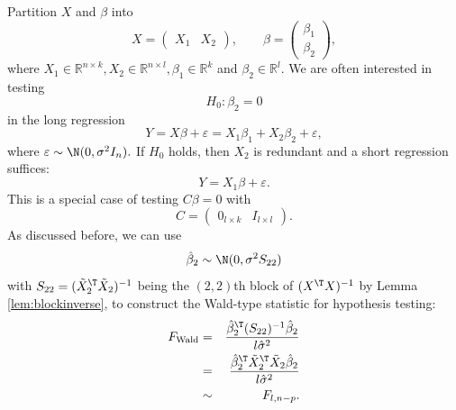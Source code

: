 Partition $X$ and $\beta$ into
\[
X=\left(\begin{array}{cc}
X_{1} & X_{2}\end{array}\right),\qquad\beta=\left(\begin{array}{c}
\beta_{1}\\
\beta_{2}
\end{array}\right),
\]
where $X_{1}\in\mathbb{R}^{n\times k},X_{2}\in\mathbb{R}^{n\times l},\beta_{1}\in\mathbb{R}^{k}$
and $ \beta_2 \in  \mathbb{R}^{l}.$ We are often interested in testing
\[
H_{0}:\beta_{2}=0
\]
in the long regression
\begin{equation}
Y=X\beta+\varepsilon=X_{1}\beta_{1}+X_{2}\beta_{2}+\varepsilon,\label{eq:longreg}
\end{equation}
where $\varepsilon\sim\N(0,\sigma^{2}I_{n}).$ If $H_{0}$ holds,
then $X_{2}$ is redundant and a short regression suffices:
\begin{equation}
Y=X_{1}\beta+\varepsilon. \label{eq:shortreg}
\end{equation}
This is a special case of testing $C\beta=0$
with 
\[
C=\left(\begin{array}{cc}
0_{l\times k} & I_{l\times l}\end{array}\right).
\]
As discussed before, we can use 
\[
\hat{\beta}_{2}\sim\N(0,\sigma^{2}S_{22})
\]
with $S_{22} = (\tilde{X}_{2}^{\T}\tilde{X}_{2})^{-1}$ being the $(2,2)$th block of $(X^{\T}X)^{-1}$ by Lemma \ref{lem:blockinverse}, to construct the Wald-type statistic for hypothesis testing:
\begin{eqnarray*}
F_{\text{Wald}}  
&=& \frac{\hat{\beta}_{2}^{\T}(S_{22})^{-1}\hat{\beta}_{2}}{l\hat{\sigma}^{2}}
\\
&=& \frac{\hat{\beta}_{2}^{\T}  \tilde{X}_{2}^{\T}\tilde{X}_{2}  \hat{\beta}_{2}}{l\hat{\sigma}^{2}}
\\
&\sim & F_{l,n-p}.
\end{eqnarray*}


